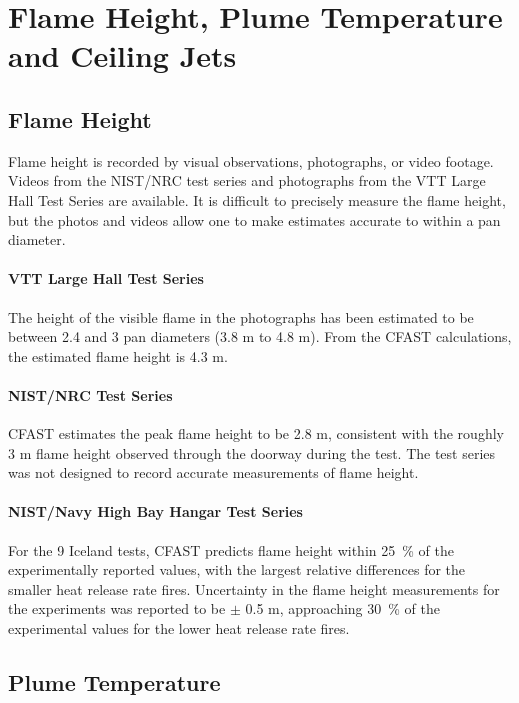 \chapter{Flame Height, Plume Temperature and Ceiling Jets}

\section{Flame Height}

Flame height is recorded by visual observations, photographs, or video footage.  Videos from the NIST/NRC test series and photographs from the VTT Large Hall Test Series are available.  It is difficult to precisely measure the flame height, but the photos and videos allow one to make estimates accurate to within a pan diameter.

\subsubsection{VTT Large Hall Test Series}

The height of the visible flame in the photographs has been estimated to be between 2.4 and 3 pan diameters (3.8 m to 4.8 m).  From the CFAST calculations, the estimated flame height is 4.3 m.

\subsubsection{NIST/NRC Test Series}

CFAST estimates the peak flame height to be 2.8 m, consistent with the roughly 3 m flame height observed through the doorway during the test.  The test series was not designed to record accurate measurements of flame height.

\subsubsection{NIST/Navy High Bay Hangar Test Series}

For the 9 Iceland tests, CFAST predicts flame height within 25~\% of the experimentally reported values, with the largest relative differences for the smaller heat release rate fires. Uncertainty in the flame height measurements for the experiments was reported to be $\pm$ 0.5 m, approaching 30~\% of the experimental values for the lower heat release rate fires.

\section{Plume Temperature}

